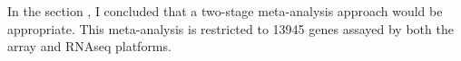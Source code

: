 In the section , I concluded that a two-stage meta-analysis approach would be appropriate.
This meta-analysis is restricted to 13945 genes assayed by both the array and \gls{RNAseq} platforms.
%
%
%
%
%
%
%
